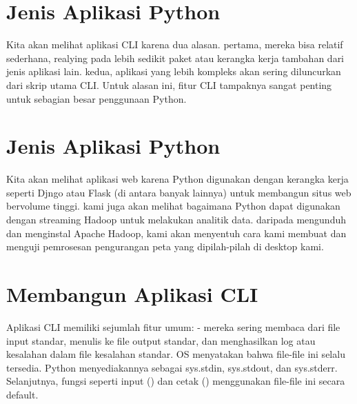 \documentclass[12pt, times new roman, a4paper]{article}
\begin{document}
\section{Jenis Aplikasi Python}
Kita akan melihat aplikasi CLI karena dua alasan. pertama, mereka bisa relatif sederhana, realying pada lebih sedikit paket atau kerangka kerja tambahan dari jenis aplikasi lain. kedua, aplikasi yang lebih kompleks akan sering diluncurkan dari skrip utama CLI. Untuk alasan ini, fitur CLI tampaknya sangat penting untuk sebagian besar penggunaan Python.

\section{Jenis Aplikasi Python}
Kita akan melihat aplikasi web karena Python digunakan dengan kerangka kerja seperti Djngo atau Flask (di antara banyak lainnya) untuk membangun situs web bervolume tinggi.
kami juga akan melihat bagaimana Python dapat digunakan dengan streaming Hadoop untuk melakukan analitik data. daripada mengunduh dan menginstal Apache Hadoop, kami akan menyentuh cara kami membuat dan menguji pemrosesan pengurangan peta yang dipilah-pilah di desktop kami.

\section{Membangun Aplikasi CLI}
Aplikasi CLI memiliki sejumlah fitur umum:
- mereka sering membaca dari file input standar, menulis ke file output standar, dan menghasilkan log atau kesalahan dalam file kesalahan standar. OS menyatakan bahwa file-file ini selalu tersedia. Python menyediakannya sebagai sys.stdin, sys.stdout, dan sys.stderr. Selanjutnya, fungsi seperti input () dan cetak () menggunakan file-file ini secara default.
\end{document}
